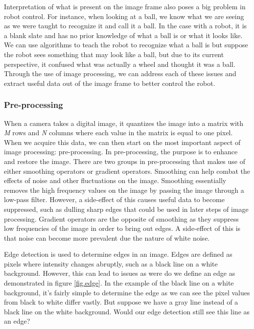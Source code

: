 \documentclass[12pt]{article}
\begin{document}
Interpretation of what is present on the image frame also poses a big problem in robot control. For instance, when looking at a ball, we know what we are seeing as we were taught to recognize it and call it a ball. In the case with a robot, it is a blank slate and has no prior knowledge of what a ball is or what it looks like. We can use algorithms to teach the robot to recognize what a ball is but suppose the robot sees something that may look like a ball, but due to its current perspective, it confused what was actually a wheel and thought it was a ball. 
Through the use of image processing, we can address each of these issues and extract useful data out of the image frame to better control the robot.



\subsubsection{Pre-processing}

When a camera takes a digital image, it quantizes the image into a matrix with \textit{M} rows and \textit{N} columns where each value in the matrix is equal to one pixel. When we acquire this data, we can then start on the most important aspect of image processing: pre-processing. In pre-processing, the purpose is to enhance and restore the image. There are two groups in pre-processing that makes use of either smoothing operators or gradient operators. Smoothing can help combat the effects of noise and other fluctuations on the image. Smoothing essentially removes the high frequency values on the image by passing the image through a low-pass filter. However, a side-effect of this causes useful data to become suppressed, such as dulling sharp edges that could be used in later steps of image processing. Gradient operators are the opposite of smoothing as they suppress low frequencies of the image in order to bring out edges. A side-effect of this is that noise can become more prevalent due the nature of white noise. 

Edge detection is used to determine edges in an image. Edges are defined as pixels where intensity changes abruptly, such as a black line on a white background. However, this can lead to issues as were do we define an edge as demonstrated in figure \ref{fig.edge}. In the example of the black line on a white background, it's fairly simple to determine the edge as we can see the pixel values from black to white differ vastly. But suppose we have a gray line instead of a black line on the white background. Would our edge detection still see this line as an edge?  
\end{document}
